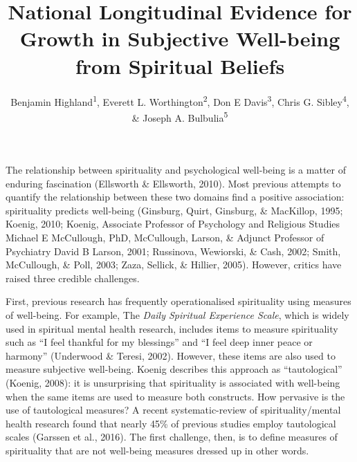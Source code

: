 \documentclass[
  english,
  man,floatsintext]{apa6}
\title{National Longitudinal Evidence for Growth in Subjective Well-being from Spiritual Beliefs}
\author{Benjamin Highland\textsuperscript{1}, Everett L. Worthington\textsuperscript{2}, Don E Davis\textsuperscript{3}, Chris G. Sibley\textsuperscript{4}, \& Joseph A. Bulbulia\textsuperscript{5}}
\date{}
\affiliation{\phantom{0}}
\begin{document}
\maketitle

The relationship between spirituality and psychological well-being is a matter of enduring fascination (Ellsworth \& Ellsworth, 2010). Most previous attempts to quantify the relationship between these two domains find a positive association: spirituality predicts well-being (Ginsburg, Quirt, Ginsburg, \& MacKillop, 1995; Koenig, 2010; Koenig, Associate Professor of Psychology and Religious Studies Michael E McCullough, PhD, McCullough, Larson, \& Adjunct Professor of Psychiatry David B Larson, 2001; Russinova, Wewiorski, \& Cash, 2002; Smith, McCullough, \& Poll, 2003; Zaza, Sellick, \& Hillier, 2005). However, critics have raised three credible challenges.

First, previous research has frequently operationalised spirituality using measures of well-being. For example, The \emph{Daily Spiritual Experience Scale}, which is widely used in spiritual mental health research, includes items to measure spirituality such as \enquote{I feel thankful for my blessings} and \enquote{I feel deep inner peace or harmony} (Underwood \& Teresi, 2002). However, these items are also used to measure subjective well-being. Koenig describes this approach as \enquote{tautological} (Koenig, 2008): it is unsurprising that spirituality is associated with well-being when the same items are used to measure both constructs. How pervasive is the use of tautological measures? A recent systematic-review of spirituality/mental health research found that nearly 45\% of previous studies employ tautological scales (Garssen et al., 2016). The first challenge, then, is to define measures of spirituality that are not well-being measures dressed up in other words.
\end{document}
